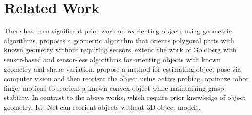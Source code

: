\section{Related Work}
\label{sec:related-work}
There has been significant prior work on reorienting objects using geometric algorithms. \citet{goldberg1993orienting} proposes a geometric algorithm that orients polygonal parts with known geometry without requiring sensors. \citet{akella-orienting-uncertainty} extend the work of Goldberg with sensor-based and sensor-less algorithms for orienting objects with known geometry and shape variation. \citet{kumbla2018enabling} propose a method for estimating object pose via computer vision and then reorient the object using active probing. \citet{grasp-gaits} optimize robot finger motions to reorient a known convex object while maintaining grasp stability. In contrast to the above works, which require prior knowledge of object geometry, Kit-Net can reorient objects without 3D object models.
